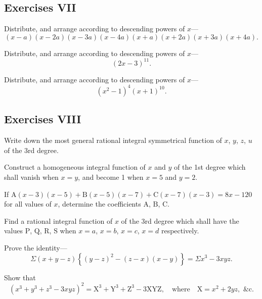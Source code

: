 \documentclass[DIN, pagenumber=false, fontsize=11pt, parskip=half]{scrartcl}
\begin{document}
\subsection{Exercises VII}

\begin{problems}[from=1,step=1]
    \problem[3] Distribute, and arrange according to descending powers of $x$---
    \[
        (x-a)(x-2a)(x-3a)(x-4a)(x+a)(x+2a)(x+3a)(x+4a).
    \]

    \problem[8] Distribute, and arrange according to descending powers of $x$---
    \[
        (2x-3)^{11}.
    \]

    \problem[10] Distribute, and arrange according to descending powers of $x$---
    \[
        (x^2-1)^4(x+1)^{10}.
    \]
\end{problems}

\subsection{Exercises VIII}

\begin{problems}[from=1,step=1]
    \problem[1] Write down the most general rational integral symmetrical function of $x$, $y$, $z$, $u$ of the 3rd degree.

    \problem[3] Construct a homogeneous integral function of $x$ and $y$ of the 1st degree which shall vanish when $x=y$, and become 1 when $x=5$ and $y=2$.

    \problem[6] If $\mathrm{A}(x-3)(x-5) + \mathrm{B}(x-5)(x-7) + \mathrm{C}(x-7)(x-3) = 8x-120$ for all values of $x$, determine the coefficients $\mathrm{A}$, $\mathrm{B}$, $\mathrm{C}$.

    \problem[9] Find a rational integral function of $x$ of the 3rd degree which shall have the values $\mathrm{P}$, $\mathrm{Q}$, $\mathrm{R}$, $\mathrm{S}$ when $x=a$, $x=b$, $x=c$, $x=d$ respectively.

    \problem[19] Prove the identity---
    \[
        \Sigma(x+y-z)\left\{(y-z)^2 - (z-x)(x-y)\right\} = \Sigma x^3 - 3xyz.
    \]

    \problem[21] Show that
    \[
        (x^3+y^3+z^3-3xyz)^2 = \mathrm{X}^3 + \mathrm{Y}^3 + \mathrm{Z}^3 - 3\mathrm{XYZ},
        \quad\text{where}\quad \mathrm{X} = x^2+2yz, \text{ \&c.}
    \]
\end{problems}
\end{document}
